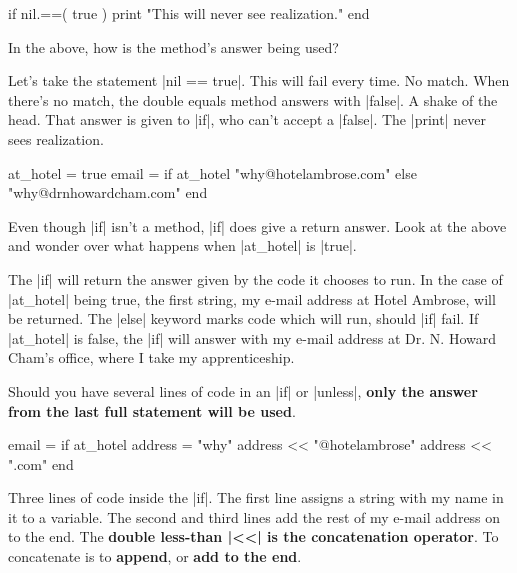 \documentclass[12pt,twoside]{report}
\begin{document}
\begin{rubycode}

 if nil.==( true )
   print "This will never see realization."  
 end

\end{rubycode}


In the above, how is the method's answer being used?

Let's take the statement \rubyinline|nil == true|.
This will fail every time.  No match.  When there's no match, the
double equals method answers with \rubyinline|false|.
A shake of the head. That answer is given to
\rubyinline|if|, who can't accept a
\rubyinline|false|.  The
\rubyinline|print| never sees realization.


\begin{rubycode}

 at_hotel = true 
 email = if at_hotel 
           "why@hotelambrose.com" 
         else
           "why@drnhowardcham.com" 
         end

\end{rubycode}


Even though \rubyinline|if| isn't a method,
\rubyinline|if| does give a return answer.  Look at
the above and wonder over what happens when
\rubyinline|at_hotel| is
\rubyinline|true|.

The \rubyinline|if| will return the answer given by
the code it chooses to run.  In the case of
\rubyinline|at_hotel| being true, the first string, my
e-mail address at Hotel Ambrose, will be returned.  The
\rubyinline|else| keyword marks code which will run,
should \rubyinline|if| fail.  If
\rubyinline|at_hotel| is false, the
\rubyinline|if| will answer with my e-mail address at
Dr. N. Howard Cham's office, where I take my apprenticeship.

Should you have several lines of code in an
\rubyinline|if| or
\rubyinline|unless|, {\bf only the answer from the
  last full statement will be used}.


\begin{rubycode}

 email = if at_hotel 
           address = "why" 
           address << "@hotelambrose"
           address << ".com"
         end

\end{rubycode}


Three lines of code inside the \rubyinline|if|.  The
first line assigns a string with my name in it to a variable. The
second and third lines add the rest of my e-mail address on to the
end.  The {\bf double less-than \rubyinline|<<| is the
  concatenation operator}.  To concatenate is to {\bf append}, or {\bf
  add to the end}.
\end{document}
